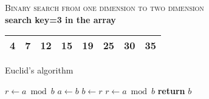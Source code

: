 \documentclass{article}
\begin{document}
\begin{table}[h]
    \centering
\textsc{\Large Binary search from one dimension to two dimension}\\[0.1cm]
\textbf{search key=3 in the array}\\
    \begin{tabular}{|c|c|c|c|c|c|c|c|}
        \cellcolor[gray]{0.5}4&\cellcolor[gray]{0.5}7&\cellcolor[gray]{0.5}12&\cellcolor[gray]{0.5}15&19&25&30&35\\\hline
    \end{tabular}
\end{table}

\begin{algorithm}
\caption{Euclid’s algorithm}\label{euclid}
\begin{algorithmic}[1]
   \State $r\gets a\bmod b$
      \State $a\gets b$
      \State $b\gets r$
      \State $r\gets a\bmod b$
   \EndWhile\label{euclidendwhile}
   \State \textbf{return} $b$
\EndProcedure
\end{algorithmic}
\end{algorithm}
\end{document}
